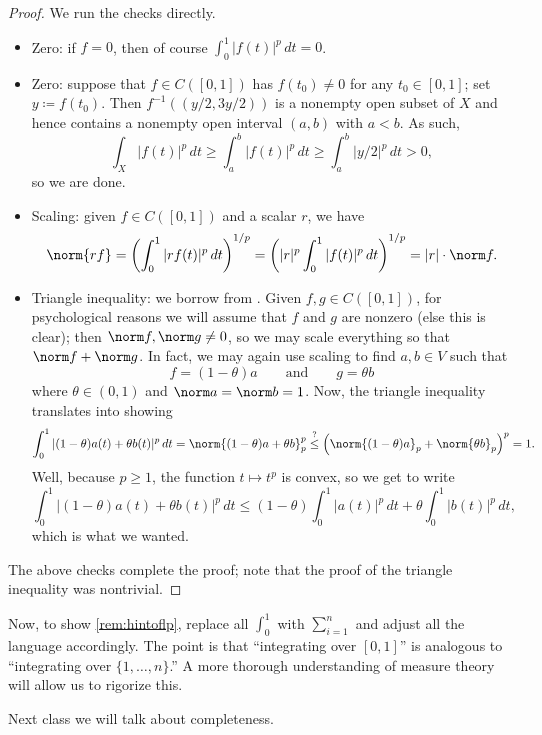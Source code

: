 \documentclass[../notes.tex]{subfiles}
\begin{document}
\begin{proof}
	We run the checks directly.
	\begin{itemize}
		\item Zero: if $f=0$, then of course $\int_0^1|f(t)|^p\,dt=0$.
		\item Zero: suppose that $f\in C([0,1])$ has $f(t_0)\ne0$ for any $t_0\in[0,1]$; set $y\coloneqq f(t_0)$. Then $f^{-1}((y/2,3y/2))$ is a nonempty open subset of $X$ and hence contains a nonempty open interval $(a,b)$ with $a<b$. As such,
		\[\int_X|f(t)|^p\,dt\ge\int_{a}^b|f(t)|^p\,dt\ge\int_{a}^b|y/2|^p\,dt>0,\]
		so we are done.
		\item Scaling: given $f\in C([0,1])$ and a scalar $r$, we have
		\[\norm{rf}=\left(\int_0^1|rf(t)|^p\,dt\right)^{1/p}=\left(|r|^p\int_0^1|f(t)|^p\,dt\right)^{1/p}=|r|\cdot\norm f.\]
		\item Triangle inequality: we borrow from \cite{lpspacestao}. Given $f,g\in C([0,1])$, for psychological reasons we will assume that $f$ and $g$ are nonzero (else this is clear); then $\norm f,\norm g\ne0$, so we may scale everything so that $\norm f+\norm g$. In fact, we may again use scaling to find $a,b\in V$ such that
		\[f=(1-\theta)a\qquad\text{and}\qquad g=\theta b\]
		where $\theta\in(0,1)$ and $\norm a=\norm b=1$. Now, the triangle inequality translates into showing
		\[\int_0^1|(1-\theta)a(t)+\theta b(t)|^p\,dt=\norm{(1-\theta)a+\theta b}^p_p\stackrel?\le\left(\norm{(1-\theta)a}_p+\norm{\theta b}_p\right)^p=1.\]
		Well, because $p\ge1$, the function $t\mapsto t^p$ is convex, so we get to write
		\[\int_0^1|(1-\theta)a(t)+\theta b(t)|^p\,dt\le(1-\theta)\int_0^1|a(t)|^p\,dt+\theta\int_0^1|b(t)|^p\,dt,\]
		which is what we wanted.
	\end{itemize}
	The above checks complete the proof; note that the proof of the triangle inequality was nontrivial.
\end{proof}
\begin{remark}
	Now, to show \autoref{rem:hintoflp}, replace all $\int_0^1$ with $\sum_{i=1}^n$ and adjust all the language accordingly. The point is that ``integrating over $[0,1]$'' is analogous to ``integrating over $\{1,\ldots,n\}$.'' A more thorough understanding of measure theory will allow us to rigorize this.
\end{remark}
Next class we will talk about completeness.
\end{document}
